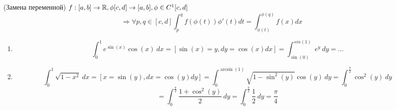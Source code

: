 \begin{properties}
    \item(Замена переменной) $ f:[a, b] \to \mathbb{R}, \phi [c, d] \to [a, b], \phi \in C^1[c, d]$ 
    \[\Rightarrow
    \forall p, q \in [c, d] \int_p^q f(\phi(t)) \phi'(t) dt
    = \int_{\phi(t)}^{\phi(q)} f(x) dx\]

    \begin{example}
        \begin{enumerate}
            \item \[ \int_0^1 e^{\sin(x)} \cos(x) \ dx = [\sin(x) = y, dy = \cos(x) dx] 
            = \int_{\sin(0)}^{sin(1)} e^y \ dy = \ldots \]
            \item \[ \int_0^1 \sqrt{1 - x^2} \ dx = [x = \sin(y), dx 
            = \cos(y) dy] = \int_0^{\arcsin(1)} \sqrt{1 - \sin^2(y)} \cos(y) \ dy 
            = \int_0^{\frac \pi 2} \cos^2(y) \ dy \] 
            \[ = \int_0^{\frac \pi 2} \frac {1 + \cos^2(y)} 2 \ dy
            = \int_0^{\frac \pi 2} \frac 1 2 \ dy = \frac \pi 4\]
        \end{enumerate}
    \end{example}
\end{properties}